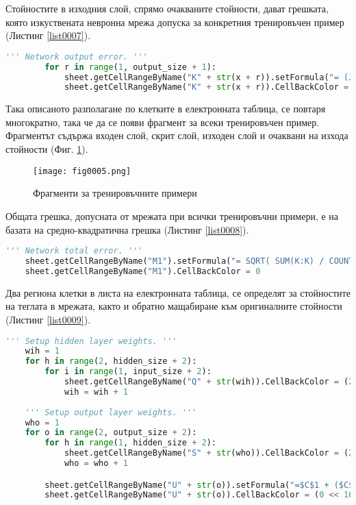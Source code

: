 Стойностите в изходния слой, спрямо очакваните стойности, дават грешката, която изкуствената невронна мрежа допуска за конкретния тренировъчен пример (Листинг \ref{list0007}).

\begin{lstlisting}[caption=Стойност на грешката допусната от мрежата за конкретния пример, language=Python, basicstyle=\tiny, label=list0007]
        ''' Network output error. '''
        for r in range(1, output_size + 1):
            sheet.getCellRangeByName("K" + str(x + r)).setFormula("= (J" + str(x + r) + "-I" + str(x + r) + ") * (J" + str(x + r) + "-I" + str(x + r) + ")")
            sheet.getCellRangeByName("K" + str(x + r)).CellBackColor = (0 << 16 | 255 << 8 | 255)
\end{lstlisting}

Така описаното разполагане по клетките в електронната таблица, се повтаря многократно, така че да се появи фрагмент за всеки тренировъчен пример. Фрагментът съдържа входен слой, скрит слой, изходен слой и очаквани на изхода стойности (Фиг. \ref{fig0005}).

\begin{figure}[H]
  \centering
  \texttt{[image: fig0005.png]}
  \caption{Фрагменти за тренировъчните примери}
\label{fig0005}
\end{figure}

Общата грешка, допусната от мрежата при всички тренировъчни примери, е на базата на средно-квадратична грешка (Листинг \ref{list0008}).

\begin{lstlisting}[caption=Обща средно-квадратична грешка на мрежата, language=Python, basicstyle=\tiny, label=list0008]
    ''' Network total error. '''
    sheet.getCellRangeByName("M1").setFormula("= SQRT( SUM(K:K) / COUNT(K:K) )")
    sheet.getCellRangeByName("M1").CellBackColor = 0
\end{lstlisting}

Два региона клетки в листа на електронната таблица, се определят за стойностите на теглата в мрежата, както и обратно мащабиране към оригиналните стойности (Листинг \ref{list0009}).

\begin{lstlisting}[caption=Определяне на региони за теглата на мрежата, language=Python, basicstyle=\tiny, label=list0009]
    ''' Setup hidden layer weights. '''
    wih = 1
    for h in range(2, hidden_size + 2):
        for i in range(1, input_size + 2):
            sheet.getCellRangeByName("Q" + str(wih)).CellBackColor = (255 << 16 | 0 << 8 | 255)
            wih = wih + 1
        
    ''' Setup output layer weights. '''
    who = 1
    for o in range(2, output_size + 2):
        for h in range(1, hidden_size + 2):
            sheet.getCellRangeByName("S" + str(who)).CellBackColor = (255 << 16 | 0 << 8 | 255)
            who = who + 1

        sheet.getCellRangeByName("U" + str(o)).setFormula("=$C$1 + ($C$2 - $C$1) * ((T" + str(o) + " - $C$4) / ($C$5 - $C$4))")
        sheet.getCellRangeByName("U" + str(o)).CellBackColor = (0 << 16 | 127 << 8 | 0)
\end{lstlisting}

